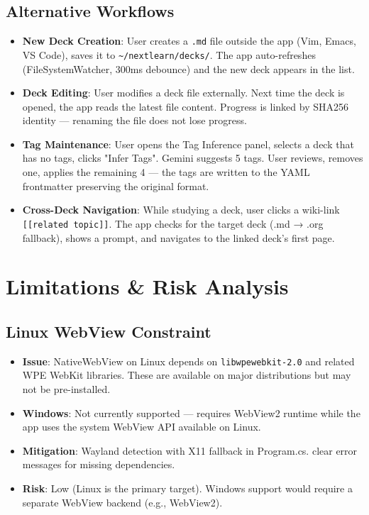 \documentclass[14pt]{article}
\begin{document}
\newpage
\subsection{Alternative Workflows}
\label{sec:org4931bb0}
\begin{itemize}
\item \textbf{\textbf{New Deck Creation}}: User creates a \texttt{.md} file outside the app
(Vim, Emacs, VS Code), saves it to \texttt{\textasciitilde{}/nextlearn/decks/}. The app
auto-refreshes (FileSystemWatcher, 300ms debounce) and the new
deck appears in the list.

\item \textbf{\textbf{Deck Editing}}: User modifies a deck file externally. Next
time the deck is opened, the app reads the latest file content.
Progress is linked by SHA256 identity — renaming the file does
not lose progress.

\item \textbf{\textbf{Tag Maintenance}}: User opens the Tag Inference panel, selects
a deck that has no tags, clicks "Infer Tags". Gemini suggests
5 tags. User reviews, removes one, applies the remaining 4 —
the tags are written to the YAML frontmatter preserving the
original format.

\item \textbf{\textbf{Cross-Deck Navigation}}: While studying a deck, user clicks a
wiki-link \texttt{[[related topic]]}. The app checks for the target
deck (.md → .org fallback), shows a prompt, and navigates to
the linked deck's first page.
\end{itemize}
\section{Limitations \& Risk Analysis}
\label{sec:org3fcf096}
\subsection{Linux WebView Constraint}
\label{sec:org605235f}
\begin{itemize}
\item \textbf{\textbf{Issue}}: NativeWebView on Linux depends on \texttt{libwpewebkit-2.0} and
related WPE WebKit libraries. These are available on major
distributions but may not be pre-installed.
\item \textbf{\textbf{Windows}}: Not currently supported — requires WebView2 runtime
while the app uses the system WebView API available on Linux.
\item \textbf{\textbf{Mitigation}}: Wayland detection with X11 fallback in Program.cs.
clear error messages for missing dependencies.
\item \textbf{\textbf{Risk}}: Low (Linux is the primary target). Windows support would
require a separate WebView backend (e.g., WebView2).
\end{itemize}
\end{document}
